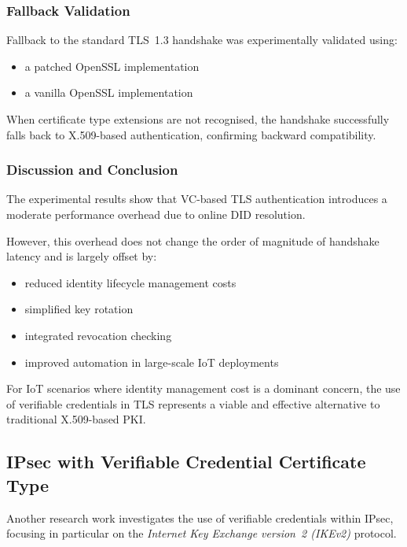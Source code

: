 \vspace{1.5 cm}

\subsubsection*{Fallback Validation}

\noindent
Fallback to the standard TLS~1.3 handshake was experimentally validated using:
\begin{itemize}
    \item a patched OpenSSL implementation
    \item a vanilla OpenSSL implementation
\end{itemize}

\noindent
When certificate type extensions are not recognised, the handshake successfully falls back to X.509-based authentication, confirming backward compatibility.

\subsubsection*{Discussion and Conclusion}

\noindent
The experimental results show that VC-based TLS authentication introduces a moderate performance overhead due to online DID resolution.

\noindent
However, this overhead does not change the order of magnitude of handshake latency and is largely offset by:
\begin{itemize}
    \item reduced identity lifecycle management costs
    \item simplified key rotation
    \item integrated revocation checking
    \item improved automation in large-scale IoT deployments
\end{itemize}

\noindent
For IoT scenarios where identity management cost is a dominant concern, the use of verifiable credentials in TLS represents a viable and effective alternative to traditional X.509-based PKI.



\subsection{IPsec with Verifiable Credential Certificate Type}

\noindent
Another research work investigates the use of verifiable credentials within IPsec, focusing in particular on the \emph{Internet Key Exchange version~2 (IKEv2)} protocol.
\medskip

